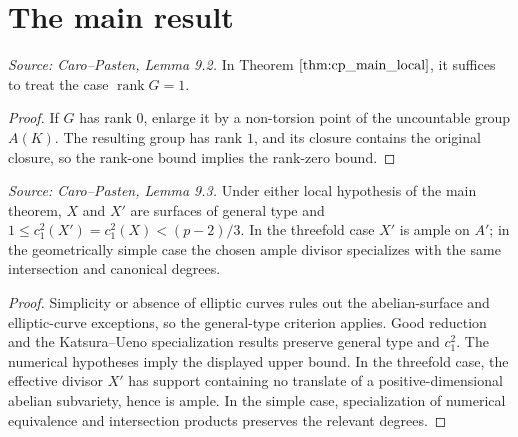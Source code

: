\section{The main result}

\begin{lemma}
  \label{lem:cp_rank_one_reduction}
  \textit{Source: Caro--Pasten, Lemma 9.2.}
  In Theorem \(\ref{thm:cp_main_local}\), it suffices to treat the case
  \(\operatorname{rank}G=1\).
\end{lemma}
\begin{proof}
  If \(G\) has rank \(0\), enlarge it by a non-torsion point of the uncountable
  group \(A(K)\).  The resulting group has rank \(1\), and its closure contains
  the original closure, so the rank-one bound implies the rank-zero bound.
\end{proof}

\begin{lemma}
  \label{lem:cp_main_hypotheses}
  \textit{Source: Caro--Pasten, Lemma 9.3.}
  Under either local hypothesis of the main theorem, \(X\) and \(X'\) are
  surfaces of general type and
  \(1\le c_1^2(X')=c_1^2(X)<(p-2)/3\).  In the threefold case \(X'\) is ample
  on \(A'\); in the geometrically simple case the chosen ample divisor
  specializes with the same intersection and canonical degrees.
\end{lemma}
\begin{proof}
  Simplicity or absence of elliptic curves rules out the abelian-surface and
  elliptic-curve exceptions, so the general-type criterion applies.  Good
  reduction and the Katsura--Ueno specialization results preserve general type
  and \(c_1^2\).  The numerical hypotheses imply the displayed upper bound.
  In the threefold case, the effective divisor \(X'\) has support containing no
  translate of a positive-dimensional abelian subvariety, hence is ample.  In
  the simple case, specialization of numerical equivalence and intersection
  products preserves the relevant degrees.
\end{proof}

